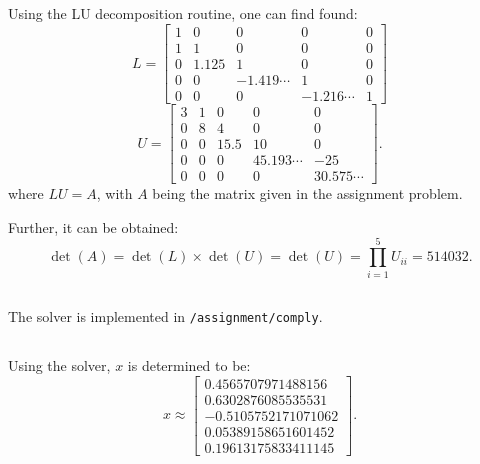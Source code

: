 \documentclass[10pt, a4paper]{article}
\begin{document}
  \subsection{}
  Using the LU decomposition routine, one can find found\footnotemark:
  \begin{equation}
    L = \begin{bmatrix}1 & 0 & 0 & 0 & 0 \\ 1 & 1 & 0 & 0 & 0 \\ 0 & 1.125 & 1 & 0 & 0 \\ 0 & 0 & -1.419\cdots & 1 & 0 \\ 0 & 0 & 0 & -1.216\cdots & 1\end{bmatrix}
  \end{equation}
  \begin{equation}
    U = \begin{bmatrix}3 & 1 & 0 & 0 & 0 \\ 0 & 8 & 4 & 0 & 0 \\ 0 & 0 & 15.5 & 10 & 0 \\ 0 & 0 & 0 & 45.193\cdots & -25 \\ 0 & 0 & 0 & 0 & 30.575\cdots\end{bmatrix}.
  \end{equation}
  where $LU = A$, with $A$ being the matrix given in the assignment problem.


  Further, it can be obtained:
  \begin{equation}
    \det(A) = \det(L) \times \det(U) = \det(U) = \prod_{i=1}^5 U_{ii} = 514032.
  \end{equation}

  \subsection{}
  The solver is implemented in \texttt{/assignment/comply}.

  \subsection{}
  Using the solver, $x$ is determined to be:
  \begin{equation}
    x \approx \begin{bmatrix}0.4565707971488156 \\ 0.6302876085535531 \\ -0.5105752171071062 \\ 0.05389158651601452 \\ 0.19613175833411145\end{bmatrix}.
  \end{equation}
\end{document}
